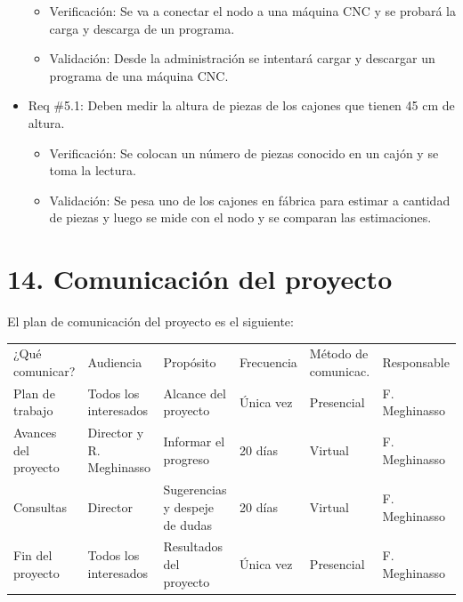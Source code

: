 \documentclass[11pt]{charter}
\begin{document}
\begin{itemize}
    \begin{itemize}
        \item Verificación: Se va a conectar el nodo a una máquina CNC y se probará la carga y descarga de un programa. 
        \item Validación: Desde la administración se intentará cargar y descargar un programa de una máquina CNC.
    \end{itemize}
    \item Req \#5.1: Deben medir la altura de piezas de los cajones que tienen 45 cm de altura.
    \begin{itemize}
        \item Verificación: Se colocan un número de piezas conocido en un cajón y se toma la lectura.  
        \item Validación: Se pesa uno de los cajones en fábrica para estimar a cantidad de piezas y luego se mide con el nodo y se comparan las estimaciones.  
    \end{itemize}
\end{itemize}


\section{14. Comunicación del proyecto}
\label{sec:comunicaciones}

El plan de comunicación del proyecto es el siguiente:

\begin{table}[htpb]
\centering
\begin{tabularx}{\linewidth}{@{}|X|C{2.4cm}|C{3cm}|C{1.8cm}|C{2cm}|C{2.1cm}|@{}}
\hline
{} 
           \\ \hline
{} 
¿Qué comunicar? & Audiencia & Propósito & Frecuencia & Método de comunicac. & Responsable \\ \hline
 Plan de trabajo  & Todos los interesados  &  Alcance del proyecto  &  Única vez   &  Presencial  & F. Meghinasso  \\ \hline
Avances del proyecto   &   Director y R. Meghinasso  &  Informar el progreso  &  20 días  & Virtual &  F. Meghinasso  \\ \hline
Consultas   &  Director  & Sugerencias y despeje de dudas & 20 días  &  Virtual & F. Meghinasso \\ \hline
Fin del proyecto  & Todos los interesados & Resultados del proyecto  & Única vez & Presencial & F. Meghinasso \\ \hline
\end{tabularx}
\end{table}
\end{document}

